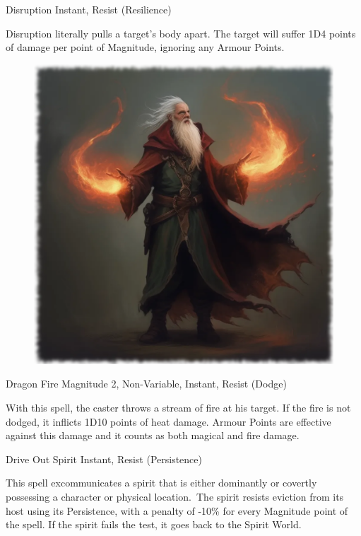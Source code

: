 \begin{rpg-spell}
{Disruption}
{Instant, Resist (Resilience)}

Disruption literally pulls a target’s body apart. The target will suffer 1D4 points of damage per point of Magnitude, ignoring any Armour Points. 
\end{rpg-spell}
 

\begin{figure}[h]
\begin{center}
\includegraphics[scale=0.24]{img/ai-images/wizard-fire.png}
\end{center}
\end{figure}

\begin{rpg-spell}
{Dragon Fire}
{Magnitude 2, Non-Variable, Instant, Resist (Dodge)}

With this spell, the caster throws a stream of fire at his target. If the fire is not dodged, it inflicts 1D10 points of heat damage. Armour Points are effective against this damage and it counts as both magical and fire damage.
\end{rpg-spell}


\begin{rpg-spell}
{Drive Out Spirit}
{Instant, Resist (Persistence)}

This spell excommunicates a spirit that is either dominantly or covertly possessing a character or physical location. The spirit resists eviction from its host using its Persistence, with a penalty of -10\% for every Magnitude point of the spell. If the spirit fails the test, it goes back to the Spirit World.
\end{rpg-spell}


